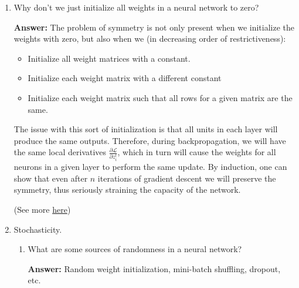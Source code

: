 \documentclass{article}
\newenvironment{QandA}{\begin{enumerate}[label=\arabic*.]}{\end{enumerate}}
\newenvironment{InnerQandA}{\begin{enumerate}[label=\roman*.]}{\end{enumerate}}
\newenvironment{answer}{\par\normalfont \textbf{Answer:}}{}
\begin{document}
\begin{QandA}
    \item Why don’t we just initialize all weights in a neural network to zero?
    \begin{answer}
        The problem of symmetry is not only present when we initialize the weights with zero, but also when we (in decreasing order of restrictiveness):
        \begin{itemize}
            \item Initialize all weight matrices with a constant.
            \item Initialize each weight matrix with a different constant
            \item Initialize each weight matrix such that all rows for a given matrix are the same. 
        \end{itemize}
        The issue with this sort of initialization is that all units in each layer will produce the same outputs. Therefore, during backpropagation, we will have the same local derivatives $\frac{\partial \mathcal{L}}{\partial z^{l}_i}$, which in turn will cause the weights for all neurons in a given layer to perform the same update. By induction, one can show that even after $n$ iterations of gradient descent we will preserve the symmetry, thus seriously straining the capacity of the network. 

        (See more \href{https://www.coursera.org/lecture/neural-networks-deep-learning/www.deeplearning.ai-XtFPI}{here})
    \end{answer}

    \item Stochasticity.
    \begin{InnerQandA}
        \item What are some sources of randomness in a neural network?
        \begin{answer}
            Random weight initialization, mini-batch shuffling, dropout, etc.
        \end{answer}


\end{InnerQandA}
\end{QandA}
\end{document}
